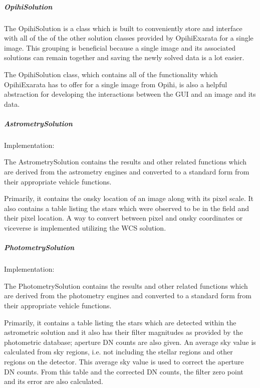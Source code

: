 \documentclass[letterpaper,11pt,english]{sphinxmanual}
\begin{document}
\subparagraph{OpihiSolution}
\label{\detokenize{technical/architecture/vehicles_solutions:opihisolution}}
\sphinxAtStartPar
The OpihiSolution is a class which is built to conveniently store and interface
with all of the of the other solution classes provided by OpihiExarata for a
single image. This grouping is beneficial because a single image and its
associated solutions can remain together and saving the newly solved data is
a lot easier.

\sphinxAtStartPar
The OpihiSolution class, which contains all of the functionality which
OpihiExarata has to offer for a single image from Opihi, is also a helpful
abstraction for developing the interactions between the GUI and an image and
its data.


\subparagraph{AstrometrySolution}
\label{\detokenize{technical/architecture/vehicles_solutions:astrometrysolution}}
\sphinxAtStartPar
Implementation: {\hyperref[\detokenize{code/opihiexarata.astrometry.solution:opihiexarata.astrometry.solution.AstrometricSolution}]{}}

\sphinxAtStartPar
The AstrometrySolution contains the results and other related functions
which are derived from the astrometry engines and converted to a standard
form from their appropriate vehicle functions.

\sphinxAtStartPar
Primarily, it contains the on\sphinxhyphen{}sky location of an image along with its pixel
scale. It also contains a table listing the stars which were observed to be
in the field and their pixel location. A way to convert between pixel and
on\sphinxhyphen{}sky coordinates or vice\sphinxhyphen{}verse is implemented utilizing the WCS solution.


\subparagraph{PhotometrySolution}
\label{\detokenize{technical/architecture/vehicles_solutions:photometrysolution}}
\sphinxAtStartPar
Implementation: {\hyperref[\detokenize{code/opihiexarata.photometry.solution:opihiexarata.photometry.solution.PhotometricSolution}]{}}

\sphinxAtStartPar
The PhotometrySolution contains the results and other related functions
which are derived from the photometry engines and converted to a standard
form from their appropriate vehicle functions.

\sphinxAtStartPar
Primarily, it contains a table listing the stars which are detected within the
astrometric solution and it also has their filter magnitudes as provided by the
photometric database; aperture DN counts are also given. An average sky value
is calculated from sky regions, i.e. not including the stellar regions and
other regions on the detector. This average sky value is used to correct the
aperture DN counts. From this table and the corrected DN counts, the filter
zero point and its error are also calculated.
\end{document}
